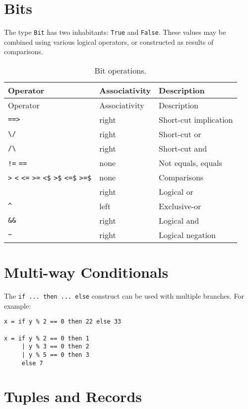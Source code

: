 \hypertarget{bits}{%
\section{Bits}\label{bits}}

The type \texttt{Bit} has two inhabitants: \texttt{True} and
\texttt{False}. These values may be combined using various logical
operators, or constructed as results of comparisons.

\begin{longtable}[]{@{}lll@{}}
\caption{Bit operations.}\tabularnewline
\toprule
Operator & Associativity & Description\tabularnewline
\midrule
\endfirsthead
\toprule
Operator & Associativity & Description\tabularnewline
\midrule
\endhead
\texttt{==\textgreater{}} & right & Short-cut implication\tabularnewline
\texttt{\textbackslash{}/} & right & Short-cut or\tabularnewline
\texttt{/\textbackslash{}} & right & Short-cut and\tabularnewline
\texttt{!=} \texttt{==} & none & Not equals, equals\tabularnewline
\texttt{\textgreater{}} \texttt{\textless{}} \texttt{\textless{}=}
\texttt{\textgreater{}=} \texttt{\textless{}\$}
\texttt{\textgreater{}\$} \texttt{\textless{}=\$}
\texttt{\textgreater{}=\$} & none & Comparisons\tabularnewline
\texttt{\textbar{}\textbar{}} & right & Logical or\tabularnewline
\texttt{\^{}} & left & Exclusive-or\tabularnewline
\texttt{\&\&} & right & Logical and\tabularnewline
\texttt{\textasciitilde{}} & right & Logical negation\tabularnewline
\bottomrule
\end{longtable}

\hypertarget{multi-way-conditionals}{%
\section{Multi-way Conditionals}\label{multi-way-conditionals}}

The \texttt{if\ ...\ then\ ...\ else} construct can be used with
multiple branches. For example:

\begin{verbatim}
x = if y % 2 == 0 then 22 else 33

x = if y % 2 == 0 then 1
     | y % 3 == 0 then 2
     | y % 5 == 0 then 3
     else 7
\end{verbatim}

\hypertarget{tuples-and-records}{%
\section{Tuples and Records}\label{tuples-and-records}}

